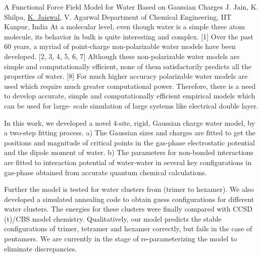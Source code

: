 
    \begin{abstract_online}{A Functional Force Field Model for Water Based on Gaussian Charges }{%
        J. Jain, K. Shilpa, \underline{K. Jaiswal}, V. Agarwal}{%
        }{%
        Department of Chemical Engineering, IIT Kanpur, India}
    At a molecular level, even though water is a simple three atom molecule, its behavior in bulk is quite interesting and complex. [1] Over the past 60 years, a myriad of point-charge non-polarizable water models have been developed. [2, 3, 4, 5, 6, 7] Although these non-polarizable water models are simple and computationally efficient, none of them satisfactorily predicts all the properties of water. [8] For much higher accuracy polarizable water models are used which require much greater computational power. Therefore, there is a need to develop accurate, simple and computationally efficient empirical models which can be used for large- scale simulation of large systems like electrical double layer. \par In this work, we developed a novel 4-site, rigid, Gaussian charge water model, by a two-step fitting process. a) The Gaussian sizes and charges are fitted to get the positions and magnitude of critical points in the gas-phase electrostatic potential and the dipole moment of water. b) The parameters for non-bonded interactions are fitted to interaction potential of water-water in several key configurations in gas-phase obtained from accurate quantum chemical calculations. \par  Further the model is tested for water clusters from (trimer to hexamer). We also developed a simulated annealing code to obtain guess configurations for different water clusters. The energies for these clusters were finally compared with CCSD (t)/CBS model chemistry. Qualitatively, our model predicts the stable configurations of trimer, tetramer and hexamer correctly, but fails in the case of pentamers. We are currently in the stage of re-parameterizing the model to eliminate discrepancies. 
    

\end{abstract_online}
